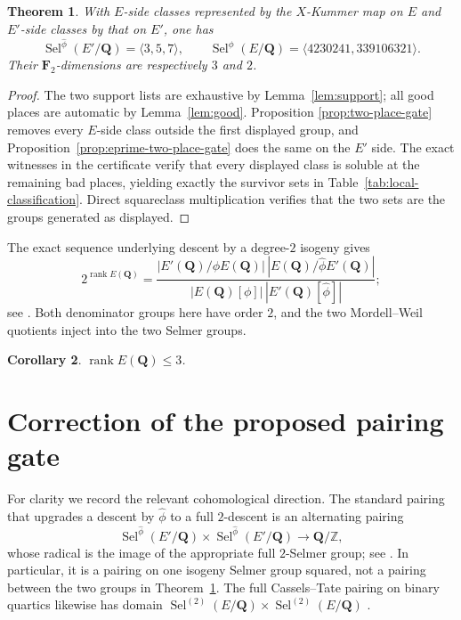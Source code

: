 \documentclass[11pt]{article}
\newtheorem{theorem}{Theorem}
\newtheorem{corollary}[theorem]{Corollary}
\newcommand{\Q}{\mathbf Q}
\newcommand{\F}{\mathbf F}
\newcommand{\Sel}{\operatorname{Sel}}
\begin{document}
\begin{theorem}\label{thm:selmer}
With $E$-side classes represented by the $X$-Kummer map on $E$ and
$E'$-side classes by that on $E'$, one has
\[
 \Sel^{\widehat\phi}(E'/\Q)=\langle3,5,7\rangle,
 \qquad
 \Sel^{\phi}(E/\Q)=\langle4230241,339106321\rangle.
\]
Their $\F_2$-dimensions are respectively $3$ and $2$.
\end{theorem}
\begin{proof}
The two support lists are exhaustive by Lemma~\ref{lem:support}; all good
places are automatic by Lemma~\ref{lem:good}.  Proposition
\ref{prop:two-place-gate} removes every $E$-side class outside the first
displayed group, and Proposition~\ref{prop:eprime-two-place-gate} does the
same on the $E'$ side.  The exact witnesses in the certificate verify that
every displayed class is soluble at the remaining bad places, yielding
exactly the survivor sets in Table~\ref{tab:local-classification}.  Direct squareclass multiplication
verifies that the two sets are
the groups generated as displayed.
\end{proof}

The exact sequence underlying descent by a degree-$2$ isogeny gives
\[
 2^{\operatorname{rank}E(\Q)}=
 \frac{|E'(\Q)/\phi E(\Q)|\,|E(\Q)/\widehat\phi E'(\Q)|}
 {|E(\Q)[\phi]|\,|E'(\Q)[\widehat\phi]|};
\]
see \cite[pp.~368--369]{vanBeekFisher2018}.  Both denominator groups here
have order $2$, and the two Mordell--Weil quotients inject into the two
Selmer groups.
\begin{corollary}\label{cor:rank}
$\operatorname{rank}E(\Q)\le3$.
\end{corollary}

\section{Correction of the proposed pairing gate}
For clarity we record the relevant cohomological direction.  The standard
pairing that upgrades a descent by $\widehat\phi$ to a full $2$-descent is
an alternating pairing
\begin{equation}\label{eq:isog-pairing}
 \Sel^{\widehat\phi}(E'/\Q)\times
 \Sel^{\widehat\phi}(E'/\Q)\longrightarrow\Q/\mathbb Z,
\end{equation}
whose radical is the image of the appropriate full $2$-Selmer group; see
\cite[Equation~(2)]{vanBeekFisher2018}.  In particular, it is a pairing on
one isogeny Selmer group squared, not a pairing between the two groups in
Theorem~\ref{thm:selmer}.  The full Cassels--Tate pairing on binary quartics
likewise has domain $\Sel^{(2)}(E/\Q)\times\Sel^{(2)}(E/\Q)$
\cite[Theorem~3.1]{Fisher2022}.
\end{document}
